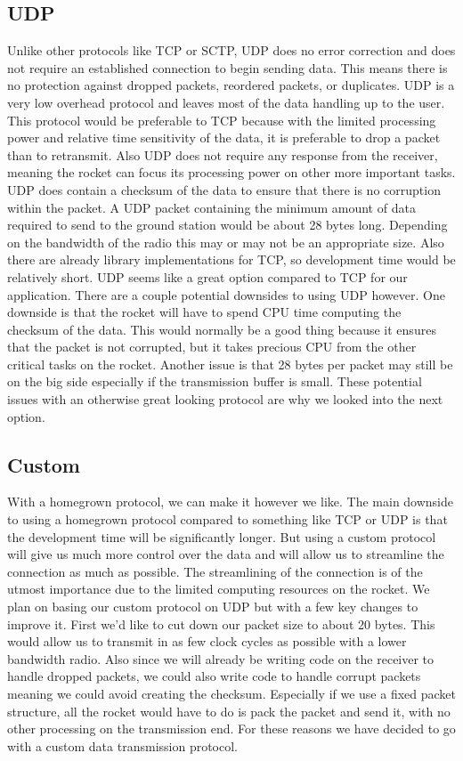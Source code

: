 \documentclass[onecolumn, draftclsnofoot,10pt, compsoc]{IEEEtran}
\begin{document}
\subsection{UDP}
Unlike other protocols like TCP or SCTP, UDP does no error correction and does not require an established connection to begin sending data.
This means there is no protection against dropped packets, reordered packets, or duplicates.
UDP is a very low overhead protocol and leaves most of the data handling up to the user.
This protocol would be preferable to TCP because with the limited processing power and relative time sensitivity of the data, it is preferable to drop a packet than to retransmit.
Also UDP does not require any response from the receiver, meaning the rocket can focus its processing power on other more important tasks.
UDP does contain a checksum of the data to ensure that there is no corruption within the packet.
A UDP packet containing the minimum amount of data required to send to the ground station would be about 28 bytes long.
Depending on the bandwidth of the radio this may or may not be an appropriate size.
Also there are already library implementations for TCP, so development time would be relatively short.
UDP seems like a great option compared to TCP for our application.
There are a couple potential downsides to using UDP however.
One downside is that the rocket will have to spend CPU time computing the checksum of the data.
This would normally be a good thing because it ensures that the packet is not corrupted, but it takes precious CPU from the other critical tasks on the rocket.
Another issue is that 28 bytes per packet may still be on the big side especially if the transmission buffer is small.
These potential issues with an otherwise great looking protocol are why we looked into the next option.

\subsection{Custom}
With a homegrown protocol, we can make it however we like.
The main downside to using a homegrown protocol compared to something like TCP or UDP is that the development time will be significantly longer.
But using a custom protocol will give us much more control over the data and will allow us to streamline the connection as much as possible.
The streamlining of the connection is of the utmost importance due to the limited computing resources on the rocket.
We plan on basing our custom protocol on UDP but with a few key changes to improve it.
First we'd like to cut down our packet size to about 20 bytes.
This would allow us to transmit in as few clock cycles as possible with a lower bandwidth radio.
Also since we will already be writing code on the receiver to handle dropped packets, we could also write code to handle corrupt packets meaning we could avoid creating the checksum.
Especially if we use a fixed packet structure, all the rocket would have to do is pack the packet and send it, with no other processing on the transmission end.
For these reasons we have decided to go with a custom data transmission protocol.
\end{document}
